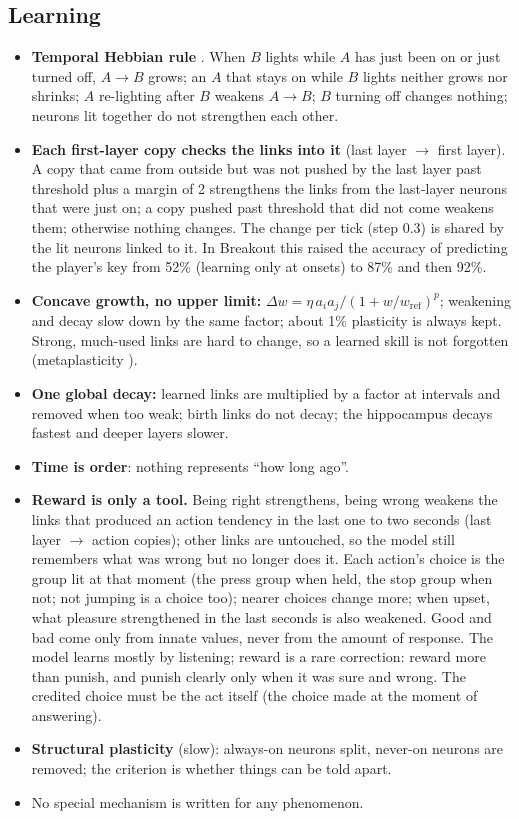 \documentclass[11pt]{article}
\begin{document}
\subsection{Learning}
\begin{itemize}
\item \textbf{Temporal Hebbian rule} \cite{hebb_1949}. When $B$ lights while $A$ has just been on or just turned off, $A\to B$ grows; an
$A$ that stays on while $B$ lights neither grows nor shrinks; $A$ re-lighting after $B$ weakens $A\to B$; $B$ turning
off changes nothing; neurons lit together do not strengthen each other.
\item \textbf{Each first-layer copy checks the links into it} (last layer $\to$ first layer). A copy that came from
outside but was not pushed by the last layer past threshold plus a margin of 2 strengthens the links from the last-layer
neurons that were just on; a copy pushed past threshold that did not come weakens them; otherwise nothing changes. The
change per tick (step 0.3) is shared by the lit neurons linked to it. In Breakout this raised the accuracy of predicting
the player's key from 52\% (learning only at onsets) to 87\% and then 92\%.
\item \textbf{Concave growth, no upper limit:} $\Delta w = \eta\, a_i a_j / (1 + w/w_\text{ref})^{p}$; weakening and decay
slow down by the same factor; about 1\% plasticity is always kept. Strong, much-used links are hard to change, so a
learned skill is not forgotten (metaplasticity \cite{abraham_bear_1996,yang_2009,fusi_2005,benna_fusi_2016}).
\item \textbf{One global decay:} learned links are multiplied by a factor at intervals and removed when too weak; birth
links do not decay; the hippocampus decays fastest and deeper layers slower.
\item \textbf{Time is order}: nothing represents ``how long ago''.
\item \textbf{Reward is only a tool.} Being right strengthens, being wrong weakens the links that produced an action
tendency in the last one to two seconds (last layer $\to$ action copies); other links are untouched, so the model still
remembers what was wrong but no longer does it. Each action's choice is the group lit at that moment (the press group
when held, the stop group when not; not jumping is a choice too); nearer choices change more; when upset, what pleasure
strengthened in the last seconds is also weakened. Good and bad come only from innate values, never from the amount of
response. The model learns mostly by listening; reward is a rare correction: reward more than punish, and punish clearly
only when it was sure and wrong. The credited choice must be the act itself (the choice made at the moment of answering).
\item \textbf{Structural plasticity} (slow): always-on neurons split, never-on neurons are removed; the criterion is
whether things can be told apart.
\item No special mechanism is written for any phenomenon.
\end{itemize}
\end{document}
